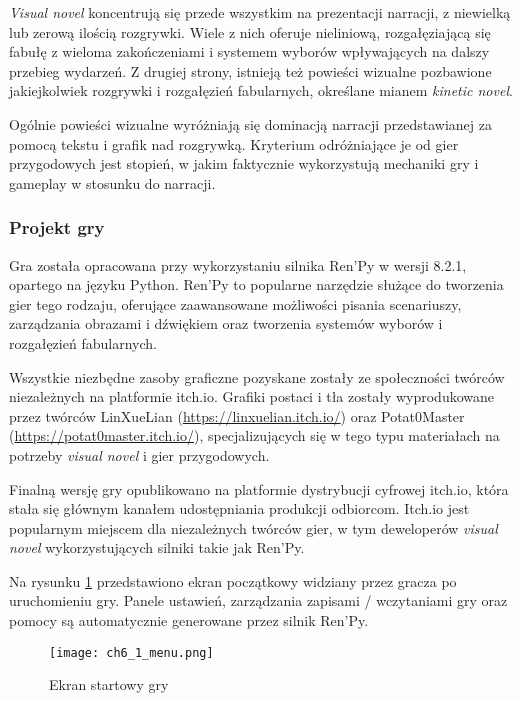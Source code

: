 \textit{Visual novel} koncentrują się przede wszystkim na prezentacji narracji, z niewielką lub zerową
ilością rozgrywki. Wiele z nich oferuje nieliniową, rozgałęziającą się fabułę z wieloma
zakończeniami i systemem wyborów wpływających na dalszy przebieg wydarzeń\cite{tvtropes_visual_novel}.
Z drugiej strony, istnieją też powieści wizualne
pozbawione jakiejkolwiek rozgrywki i rozgałęzień fabularnych, określane mianem
\textit{kinetic novel}\cite{tvtropes_kinetic_novel}.

Ogólnie powieści wizualne wyróżniają się dominacją narracji przedstawianej za pomocą tekstu i grafik nad
rozgrywką. Kryterium odróżniające je od gier przygodowych jest stopień, w jakim faktycznie
wykorzystują mechaniki gry i gameplay w stosunku do narracji\cite{tvtropes_visual_novel}.

\subsubsection*{Projekt gry}

Gra została opracowana przy wykorzystaniu silnika Ren'Py w wersji 8.2.1, opartego na języku Python.
Ren'Py to popularne narzędzie służące do tworzenia gier tego rodzaju, oferujące zaawansowane
możliwości pisania scenariuszy, zarządzania obrazami i dźwiękiem oraz tworzenia systemów wyborów
i rozgałęzień fabularnych.

Wszystkie niezbędne zasoby graficzne pozyskane zostały ze społeczności twórców niezależnych na
platformie itch.io. Grafiki postaci i tła zostały wyprodukowane przez twórców
LinXueLian (\url{https://linxuelian.itch.io/}) oraz Potat0Master (\url{https://potat0master.itch.io/}),
specjalizujących się w tego typu materiałach na potrzeby \textit{visual novel} i gier przygodowych.

Finalną wersję gry opublikowano na platformie dystrybucji cyfrowej itch.io, która stała się
głównym kanałem udostępniania produkcji odbiorcom. Itch.io jest popularnym miejscem dla niezależnych
twórców gier, w tym deweloperów \textit{visual novel} wykorzystujących silniki takie jak Ren'Py.

Na rysunku \ref{fig:ch6_1_menu} przedstawiono ekran początkowy widziany przez gracza po uruchomieniu
gry. Panele ustawień, zarządzania zapisami / wczytaniami gry oraz pomocy są automatycznie generowane
przez silnik Ren'Py.

\begin{figure}[h!]
    \centering
    \texttt{[image: ch6\_1\_menu.png]}
    \caption{Ekran startowy gry}
    \label{fig:ch6_1_menu}
\end{figure}

